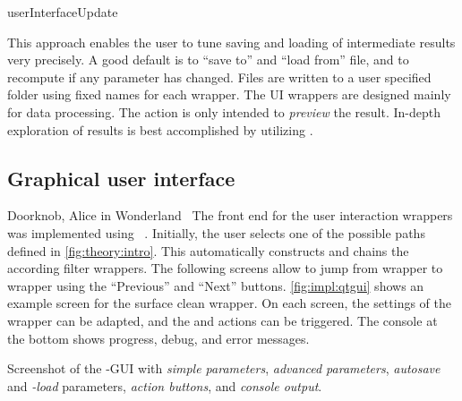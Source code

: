 \begin{algorithm}[tbhp]
 
  
  \KwOut{\result}
	
	
	\Return{\result}
\caption{userInterfaceUpdate}
\label{alg:update}
\end{algorithm}


This approach enables the user to tune saving and loading of intermediate results very precisely. A good default is to ``save to'' and ``load from'' file, and to recompute if any parameter has changed. Files are written to a user specified folder using fixed names for each wrapper. The \ac{UI} wrappers are designed mainly for data processing. The  action is only intended to \emph{preview} the result. In-depth exploration of results is best accomplished by utilizing \paraview.

\subsection{Graphical user interface}

{Doorknob, Alice in Wonderland~\cite{Alice}}
%
The front end for the user interaction wrappers was implemented using \qt~\cite{Qt}. Initially, the user selects one of the possible paths defined in \autoref{fig:theory:intro}. This automatically constructs and chains the according filter wrappers. The following screens allow to jump from wrapper to wrapper using the ``Previous'' and ``Next'' buttons. \autoref{fig:impl:qtgui} shows an example screen for the surface clean wrapper. On each screen, the settings of the wrapper can be adapted, and the  and  actions can be triggered. The console at the bottom shows progress, debug, and error messages.

{Screenshot of the \qt-\ac{GUI} with \emph{simple parameters}, \emph{advanced parameters}, \emph{autosave} and \emph{-load} parameters, \emph{action buttons}, and \emph{console output}.}







